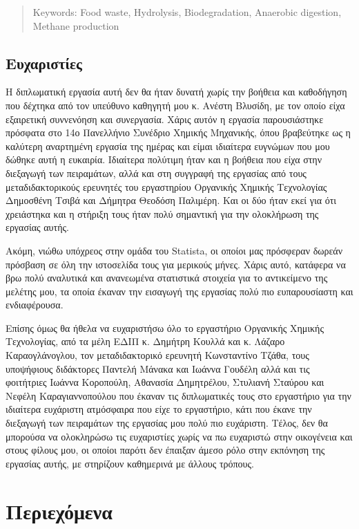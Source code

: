\documentclass[11pt]{report}
\begin{document}
\begin{abstract}


Keywords: Food waste, Hydrolysis, Biodegradation, Anaerobic digestion, Methane production
\end{abstract}

\chapter*{Ευχαριστίες}
\label{sec:org01eff5a}
Η διπλωματική εργασία αυτή δεν θα ήταν δυνατή χωρίς την βοήθεια και καθοδήγηση που δέχτηκα από τον υπεύθυνο καθηγητή μου κ. Ανέστη Βλυσίδη, με τον οποίο είχα εξαιρετική συννενόηση και συνεργασία. Χάρις αυτόν η εργασία παρουσιάστηκε πρόσφατα στο 14ο Πανελλήνιο Συνέδριο Χημικής Μηχανικής, όπου βραβεύτηκε ως η καλύτερη αναρτημένη εργασία της ημέρας και είμαι ιδιαίτερα ευγνώμων που μου δώθηκε αυτή η ευκαιρία. Ιδιαίτερα πολύτιμη ήταν και η βοήθεια που είχα στην διεξαγωγή των πειραμάτων, αλλά και στη συγγραφή της εργασίας από τους μεταδιδακτορικούς ερευνητές του εργαστηρίου Οργανικής Χημικής Τεχνολογίας Δημοσθένη Τσιβά και Δήμητρα Θεοδόση Παλιμέρη. Και οι δύο ήταν εκεί για ότι χρειάστηκα και η στήριξη τους ήταν πολύ σημαντική για την ολοκλήρωση της εργασίας αυτής.

Ακόμη, νιώθω υπόχρεος στην ομάδα του Statista, οι οποίοι μας πρόσφεραν δωρεάν πρόσβαση σε όλη την ιστοσελίδα τους για μερικούς μήνες. Χάρις αυτό, κατάφερα να βρω πολύ αναλυτικά και ανανεωμένα στατιστικά στοιχεία για το αντικείμενο της μελέτης μου, τα οποία έκαναν την εισαγωγή της εργασίας πολύ πιο ευπαρουσίαστη και ενδιαφέρουσα.

Επίσης όμως θα ήθελα να ευχαριστήσω όλο το εργαστήριο Οργανικής Χημικής Τεχνολογίας, από τα μέλη ΕΔΙΠ κ. Δημήτρη Κουλλά και κ. Λάζαρο Καραογλάνογλου, τον μεταδιδακτορικό ερευνητή Κωνσταντίνο Τζάθα, τους υποψήφιους διδάκτορες Παντελή Μάνακα και Ιωάννα Γουδέλη αλλά και τις φοιτήτριες Ιωάννα Κοροπούλη, Αθανασία Δημητρέλου, Στυλιανή Σταύρου και Νεφέλη Καραγιαννοπούλου που έκαναν τις διπλωματικές τους στο εργαστήριο για την ιδιαίτερα ευχάριστη ατμόσφαιρα που είχε το εργαστήριο, κάτι που έκανε την διεξαγωγή των πειραμάτων της εργασίας μου πολύ πιο ευχάριστη. Τέλος, δεν θα μπορούσα να ολοκληρώσω τις ευχαριστίες χωρίς να πω ευχαριστώ στην οικογένεια και στους φίλους μου, οι οποίοι παρότι δεν έπαιξαν άμεσο ρόλο στην εκπόνηση της εργασίας αυτής, με στηρίζουν καθημερινά με άλλους τρόπους.

\part*{Περιεχόμενα}
\label{sec:org310bd0b}
\tableofcontents
\pagebreak
\end{document}
